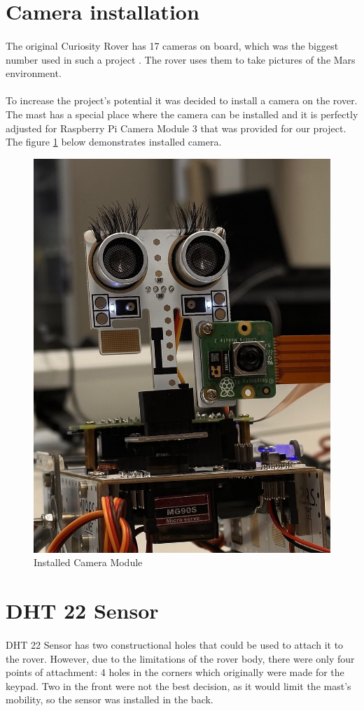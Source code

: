 \section{Camera installation}

\paragraph{}The original Curiosity Rover has 17 cameras on board, which was the biggest number used in such a project \cite{nasa:camera}. The rover uses them to take pictures of the Mars environment.  
\paragraph{} To increase the project's potential it was decided to install a camera on the rover. The mast has a special place where the camera can be installed and it is perfectly adjusted for Raspberry Pi Camera Module 3 that was provided for our project. The figure \ref{fig:cam_rover} below demonstrates installed camera. 
 \begin{figure}[h]
     \vspace{0.4cm}
     \centering
     \includegraphics[width=0.4\linewidth]{Hauptkapitel/Pictures/Camera_modul.jpg}
     \caption{Installed Camera Module}
     \label{fig:cam_rover}
 \end{figure}
 
\section{DHT 22 Sensor}

\paragraph{} DHT 22 Sensor has two constructional holes that could be used to attach it to the rover. However, due to the limitations of the rover body, there were only four points of attachment: 4 holes in the corners which originally were made for the keypad. Two in the front were not the best decision, as it would limit the mast's mobility, so the sensor was installed in the back.

